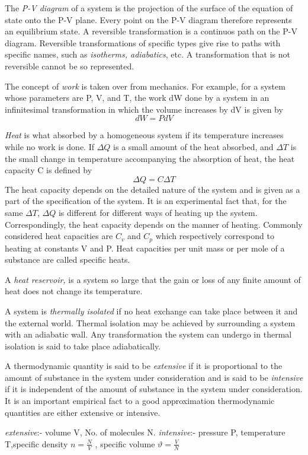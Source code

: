 \begin{definition}  
    The \emph{P-V diagram} of a system is the projection of the surface of the equation of state onto the P-V plane. Every point on the P-V diagram therefore represents an equilibrium state. A reversible transformation is a continuos path on the P-V diagram. Reversible transformations of specific types give rise to paths with specific names, such as \emph{isotherms, adiabatics}, etc. A transformation that is not reversible cannot be so represented.
\end{definition} 
\begin{definition}
    The concept of \emph{work} is taken over from mechanics. For example, for a system whose parameters are P, V, and T, the work dW done by a system in an infinitesimal transformation in which the volume increases by dV is given by 
    \[
        dW = PdV
    \]
\end{definition}
\begin{definition}  
   \emph{Heat} is what absorbed by a homogeneous system if its temperature increases while no work is done. If \(\Delta Q\) is a small amount of the heat absorbed, and \(\Delta T \) is the small change in temperature accompanying the absorption of heat, the heat capacity C is defined by
\[
    \Delta Q = C \Delta T
\]
The heat capacity depends on the detailed nature of the system and is given as a part of the specification of the system. It is an experimental fact that, for the same \(\Delta T\), \(\Delta Q\) is different for different ways of heating up the system. Correspondingly, the heat capacity depends on the manner of heating. Commonly considered heat capacities are \(C_v\) and \(C_{p} \) which respectively correspond to heating at constants V and P. Heat capacities per unit mass or per mole of a substance are called specific heats.
\end{definition}   
\begin{definition}
    A \emph{heat reservoir,} is a system so large that the gain or loss of any finite amount of heat does not change its temperature.
\end{definition}
\begin{definition}
    A system is \emph{thermally isolated} if no heat exchange can take place between it and the external world. Thermal isolation may be achieved by surrounding a system with an adiabatic wall. Any transformation the system can undergo in thermal isolation is said to take place adiabatically.
\end{definition}
\begin{definition}
    A thermodynamic quantity is said to be \emph{extensive} if it is proportional to the amount of substance in the system under consideration and is said to be \emph{intensive} if it is independent of the amount of substance in the system under consideration. It is an important empirical fact to a good approximation thermodynamic quantities are either extensive or intensive.
    \begin{eg}
        \emph{extensive}:- volume V, No. of molecules N.
        \emph{intensive}:- pressure P, temperature T,specific density \(n = \frac{N}{V}\) , specific volume \(\vartheta = \frac{V}{N}\) 
    \end{eg}
\end{definition}
